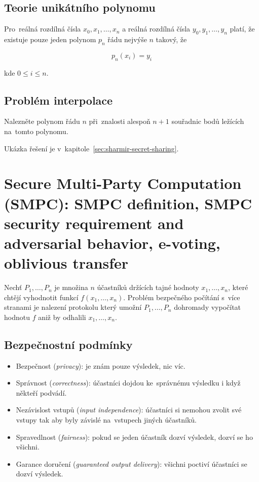 \subsection{Teorie unikátního polynomu}

Pro~reálná rozdílná čísla $x_0, x_1, \dots, x_n$ a reálná rozdílná čísla $y_0, y_1, \dots, y_n$ platí, že existuje pouze jeden polynom $p_n$ řádu nejvýše $n$ takový, že

$$p_n(x_i) = y_i$$

\noindent
kde $0 \leq i \leq n$.

\subsection{Problém interpolace}


Nalezněte polynom řádu $n$ při~znalosti alespoň $n+1$ souřadnic bodů ležících na~tomto polynomu.

Ukázka řešení je v~kapitole~\ref{sec:sharmir-secret-sharing}.


\clearpage
\section{Secure Multi-Party Computation (SMPC): SMPC definition, SMPC security requirement and adversarial behavior, e-voting, oblivious transfer}

Nechť $P_1, \dots, P_n$ je množina $n$ účastníků držících tajné hodnoty $x_1, \dots, x_n$, které chtějí vyhodnotit funkcí $f(x_1, \dots, x_n)$.
Problém bezpečného počítání s~více stranami je nalezení protokolu který umožní $P_1, \dots, P_n$ dohromady vypočítat hodnotu $f$ aniž by odhalili $x_1, \dots, x_n$.

\subsection{Bezpečnostní podmínky}

\begin{itemize}
\item Bezpečnost (\emph{privacy}): je znám pouze výsledek, nic víc.
\item Správnost (\emph{correctness}): účastníci dojdou ke~správnému výsledku i když někteří podvádí.
\item Nezávislost vstupů (\emph{input independence}): účastníci si nemohou zvolit své vstupy tak aby byly závislé na~vstupech jiných účastníků.
\item Spravedlnost (\emph{fairness}): pokud se jeden účastník dozví výsledek, dozví se ho všichni.
\item Garance doručení (\emph{guaranteed output delivery}): všichni poctiví účastníci se dozví výsledek.
\end{itemize}

